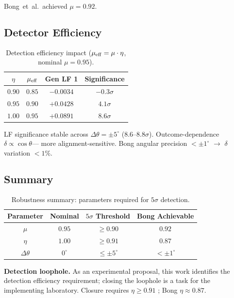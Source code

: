 \documentclass[twocolumn,aps,pra,superscriptaddress,floatfix,10pt]{revtex4-2}
\begin{document}
Bong~et~al.\ achieved $\mu = 0.92$.

\subsection{Detector Efficiency}

\begin{table}[ht]
\centering
\caption{Detection efficiency impact
($\mu_{\rm eff} = \mu \cdot \eta$, nominal $\mu = 0.95$).}
\label{tab:efficiency}
\begin{tabular}{cccc}
\toprule
$\eta$ & $\mu_{\rm eff}$ & Gen LF 1 & Significance \\
\midrule
$0.90$ & $0.85$ & $-0.0034$ & $-0.3\sigma$ \\
$0.95$ & $0.90$ & $+0.0428$ & $4.1\sigma$ \\
$1.00$ & $0.95$ & $+0.0891$ & $8.6\sigma$ \\
\bottomrule
\end{tabular}
\end{table}

LF significance stable across $\Delta\theta = \pm 5^\circ$
($8.6$--$8.8\sigma$). Outcome-dependence $\delta \propto \cos\theta$---
more alignment-sensitive. Bong angular precision $< \pm 1^\circ$
$\to$ $\delta$ variation $< 1\%$.

\subsection{Summary}

\begin{table}[ht]
\centering
\caption{Robustness summary: parameters required for $5\sigma$ detection.}
\label{tab:robustness}
\begin{tabular}{cccc}
\toprule
Parameter & Nominal & $5\sigma$ Threshold & Bong Achievable \\
\midrule
$\mu$    & $0.95$ & $\ge 0.90$ & $0.92$ \\
$\eta$   & $1.00$ & $\ge 0.91$ & $0.87$ \\
$\Delta\theta$ & $0^\circ$ & $\le \pm 5^\circ$ & $< \pm 1^\circ$ \\
\bottomrule
\end{tabular}
\end{table}

\textbf{Detection loophole.} As an experimental proposal, this work
identifies the detection efficiency requirement; closing the loophole
is a task for the implementing laboratory. Closure requires
$\eta \ge 0.91$ \cite{Brunner2014}; Bong $\eta \approx 0.87$.
\end{document}
